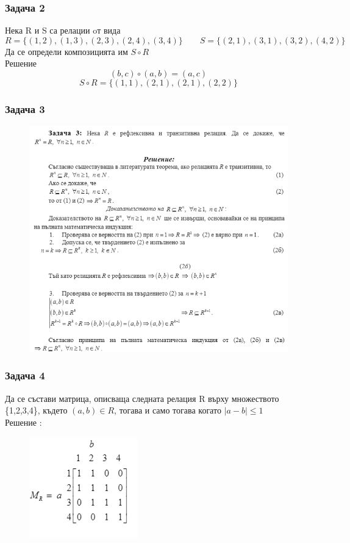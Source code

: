 \documentclass[fleqn, 12pt]{article}
\theoremstyle{definition}
\begin{document}
\subsubsection*{Задача 2}
Нека R и S са релации oт вида
$$R = \{(1, 2), (1, 3), (2, 3), (2, 4), (3, 4) \} \qquad S = \{(2, 1), (3, 1), (3, 2), (4, 2)\}$$
Да се определи композицията им $S \circ R$ \\
Решение \\
$$(b,c) \circ (a,b) = (a,c) $$
$$S \circ R = \{ (1, 1), (2, 1), (2, 1), (2, 2) \}$$

\newpage
\subsubsection*{Задача 3}
\begin{figure} [htp!]
\includegraphics[width=\linewidth]{Pics/Discrete math/ex6/ex6-task3.png}
\end{figure}

\newpage
\subsubsection*{Задача 4}
Да се състави матрица, описваща следната релация R върху множеството \{1,2,3,4\}, където $(a,b) \in R $, тогава и само тогава когато $\vert a - b \vert \leq 1$ \\
Решение : \\
\begin{figure} [htp!]
\includegraphics{Pics/Discrete math/ex6/ex6-task4.png}
\end{figure}
\end{document}
